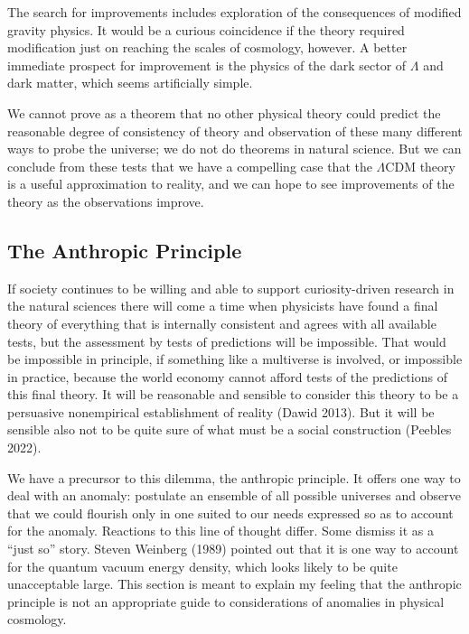 \documentclass[fleqn,12pt]{article}
\begin{document}
The search for improvements includes exploration of the consequences of modified gravity physics. It would be a curious coincidence if the theory required modification just on reaching the scales of cosmology, however. A better immediate prospect for improvement is the physics of the dark sector of $\Lambda$ and dark matter, which seems artificially simple. 

We cannot prove as a theorem that no other physical theory could predict the reasonable degree of consistency of theory and observation of these many different ways to probe the universe; we do not do theorems in natural science. But we can conclude from these tests that we have a compelling case that the $\Lambda$CDM theory is a useful approximation to reality, and we can hope to see improvements of the theory as the observations improve. 

\subsection{The Anthropic Principle}\label{sec:Anthropic}

If society continues to be willing and able to support curiosity-driven research in the natural sciences there will come a time when physicists have found a final theory of everything that is internally consistent and agrees with all available tests, but the assessment by tests of predictions will be impossible. That would be impossible in principle, if something like a multiverse is involved, or impossible in practice, because the world economy cannot afford tests of the predictions of this final theory. It will be reasonable and sensible  to consider this theory to be a persuasive nonempirical establishment of reality (Dawid 2013). But it will be sensible also not to be quite sure of what must be a social construction (Peebles 2022). 

We have a precursor to this dilemma, the anthropic principle. It offers one way to deal with an anomaly: postulate an ensemble of all possible universes and observe that we could flourish only in one suited to our needs expressed so as to account for the anomaly. Reactions to this line of thought differ. Some dismiss it as a ``just so'' story. Steven Weinberg (1989) pointed out that it is one way to account for the quantum vacuum energy density, which looks likely to be quite unacceptable large. This section is meant to explain my feeling that the anthropic principle is not an appropriate guide to considerations of anomalies in physical cosmology. 
\end{document}
